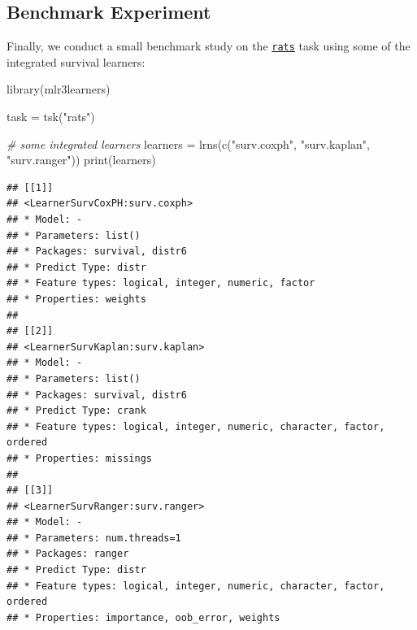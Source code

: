 \documentclass[
]{scrbook}
\newenvironment{Shaded}{\begin{snugshade}}{\end{snugshade}}
\newcommand{\AttributeTok}[1]{\textcolor[rgb]{0.77,0.63,0.00}{#1}}
\newcommand{\CommentTok}[1]{\textcolor[rgb]{0.56,0.35,0.01}{\textit{#1}}}
\newcommand{\ConstantTok}[1]{\textcolor[rgb]{0.00,0.00,0.00}{#1}}
\newcommand{\FunctionTok}[1]{\textcolor[rgb]{0.00,0.00,0.00}{#1}}
\newcommand{\NormalTok}[1]{#1}
\newcommand{\OtherTok}[1]{\textcolor[rgb]{0.56,0.35,0.01}{#1}}
\newcommand{\SpecialCharTok}[1]{\textcolor[rgb]{0.00,0.00,0.00}{#1}}
\newcommand{\StringTok}[1]{\textcolor[rgb]{0.31,0.60,0.02}{#1}}
\renewenvironment{Shaded} {\begin{snugshade}\small} {\end{snugshade}}
\begin{document}
\begin{Shaded}
\end{Shaded}

\hypertarget{benchmark-experiment}{%
\subsection{Benchmark Experiment}\label{benchmark-experiment}}

Finally, we conduct a small benchmark study on the \href{https://mlr3proba.mlr-org.com/reference/mlr_tasks_rats.html}{\texttt{rats}} task using some of the integrated survival learners:

\begin{Shaded}
\begin{Highlighting}[]
\FunctionTok{library}\NormalTok{(mlr3learners)}

\NormalTok{task }\OtherTok{=} \FunctionTok{tsk}\NormalTok{(}\StringTok{"rats"}\NormalTok{)}

\CommentTok{\# some integrated learners}
\NormalTok{learners }\OtherTok{=} \FunctionTok{lrns}\NormalTok{(}\FunctionTok{c}\NormalTok{(}\StringTok{"surv.coxph"}\NormalTok{, }\StringTok{"surv.kaplan"}\NormalTok{, }\StringTok{"surv.ranger"}\NormalTok{))}
\FunctionTok{print}\NormalTok{(learners)}
\end{Highlighting}
\end{Shaded}

\begin{verbatim}
## [[1]]
## <LearnerSurvCoxPH:surv.coxph>
## * Model: -
## * Parameters: list()
## * Packages: survival, distr6
## * Predict Type: distr
## * Feature types: logical, integer, numeric, factor
## * Properties: weights
## 
## [[2]]
## <LearnerSurvKaplan:surv.kaplan>
## * Model: -
## * Parameters: list()
## * Packages: survival, distr6
## * Predict Type: crank
## * Feature types: logical, integer, numeric, character, factor, ordered
## * Properties: missings
## 
## [[3]]
## <LearnerSurvRanger:surv.ranger>
## * Model: -
## * Parameters: num.threads=1
## * Packages: ranger
## * Predict Type: distr
## * Feature types: logical, integer, numeric, character, factor, ordered
## * Properties: importance, oob_error, weights
\end{verbatim}
\end{document}
